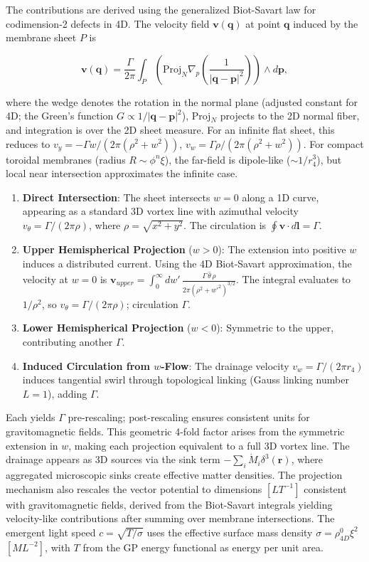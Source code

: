 The contributions are derived using the generalized Biot-Savart law for codimension-2 defects in 4D. The velocity field $\mathbf{v}(\mathbf{q})$ at point $\mathbf{q}$ induced by the membrane sheet $P$ is

\[
\mathbf{v}(\mathbf{q}) = \frac{\Gamma}{2\pi} \int_P \left( \text{Proj}_N \nabla_p \left( \frac{1}{|\mathbf{q} - \mathbf{p}|^2} \right) \right) \wedge d\mathbf{p},
\]

where the wedge denotes the rotation in the normal plane (adjusted constant for 4D; the Green's function $G \propto 1/|\mathbf{q}-\mathbf{p}|^2$), Proj$_N$ projects to the 2D normal fiber, and integration is over the 2D sheet measure. For an infinite flat sheet, this reduces to $v_y = -\Gamma w / (2\pi (\rho^2 + w^2))$, $v_w = \Gamma \rho / (2\pi (\rho^2 + w^2))$. For compact toroidal membranes (radius $R \sim \phi^n \xi$), the far-field is dipole-like ($\sim 1/r_4^3$), but local near intersection approximates the infinite case.

\begin{enumerate}
\item \textbf{Direct Intersection}: The sheet intersects $w=0$ along a 1D curve, appearing as a standard 3D vortex line with azimuthal velocity $v_\theta = \Gamma / (2\pi \rho)$, where $\rho = \sqrt{x^2 + y^2}$. The circulation is $\oint \mathbf{v} \cdot d\mathbf{l} = \Gamma$.
\item \textbf{Upper Hemispherical Projection} ($w > 0$): The extension into positive $w$ induces a distributed current. Using the 4D Biot-Savart approximation, the velocity at $w=0$ is $\mathbf{v}_{upper} = \int_0^\infty dw' \, \frac{\Gamma \, \hat{\theta} \, \rho}{2\pi (\rho^2 + w'^2)^{3/2}}$. The integral evaluates to $1 / \rho^2$, so $v_\theta = \Gamma / (2\pi \rho)$; circulation $\Gamma$.
\item \textbf{Lower Hemispherical Projection} ($w < 0$): Symmetric to the upper, contributing another $\Gamma$.
\item \textbf{Induced Circulation from $w$-Flow}: The drainage velocity $v_w = \Gamma / (2\pi r_4)$ induces tangential swirl through topological linking (Gauss linking number $L=1$), adding $\Gamma$.
\end{enumerate}

Each yields $\Gamma$ pre-rescaling; post-rescaling ensures consistent units for gravitomagnetic fields. This geometric 4-fold factor arises from the symmetric extension in $w$, making each projection equivalent to a full 3D vortex line. The drainage appears as 3D sources via the sink term $-\sum_i \dot{M}_i \delta^3(\mathbf{r})$, where aggregated microscopic sinks create effective matter densities. The projection mechanism also rescales the vector potential to dimensions $[L T^{-1}]$ consistent with gravitomagnetic fields, derived from the Biot-Savart integrals yielding velocity-like contributions after summing over membrane intersections. The emergent light speed $c = \sqrt{T / \sigma}$ uses the effective surface mass density $\sigma = \rho_{4D}^0 \xi^2$ $[M L^{-2}]$, with $T$ from the GP energy functional as energy per unit area.

